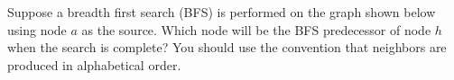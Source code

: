 \Needspace{3in}
\begin{prob}

    Suppose a breadth first search (BFS) is performed on the graph shown below using node $a$
    as the source. Which node will be the BFS predecessor of node $h$ when the search is complete?
    You should use the convention that neighbors are produced in alphabetical order.

    \grapha{}


\end{prob}
